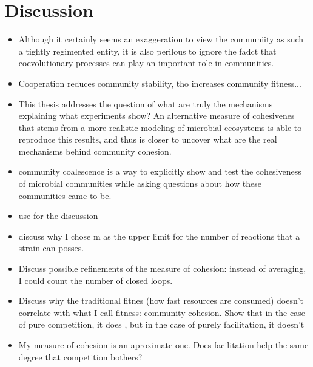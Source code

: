 \documentclass[titlepage,11pt]{article}
\begin{document}
\begin{linenumbers}
\begin{figure}
				\label{fig:community_coalescence_results}
		\end{figure}
			
			
			\section{Discussion}
				\begin{itemize}
					\item  Although it certainly seems an exaggeration to view the communiity as such a tightly regimented entity, it is also perilous to ignore the fadct that coevolutionary processes can play an important role in communities.
					\item Cooperation reduces community stability, tho increases community fitness...  \citep{Coyte2015}
					\item This thesis addresses the question of what are truly the mechanisms explaining what experiments show? An alternative measure of cohesivenes that stems from a more realistic modeling of microbial ecosystems is able to reproduce this results, and thus is closer to uncover what are the real mechanisms behind community cohesion.
					\item community coalescence is a way to explicitly show and test the cohesiveness of microbial communities while asking questions about how these communities came to be.
					\item use \citet{Pascual-Garcia2020} for the discussion
					\item discuss why I chose m as the upper limit for the number of reactions that a strain can posses.
					\item  Discuss possible refinements of the measure of cohesion: instead of averaging, I could count the number of closed loops.
					\item Discuss why the traditional fitnes (how fast resources are consumed) doesn't correlate with what I call fitness: community cohesion. Show that in the case of pure competition, it does \citep{Tikhonov2016}, but in the case of purely facilitation, it doesn't
					\item  My measure of cohesion is an aproximate one. Does facilitation help the same degree that competition bothers?
				\end{itemize}

\end{linenumbers}
\end{document}
